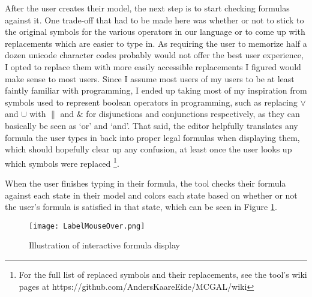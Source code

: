 After the user creates their model, the next step is to start checking formulas against it. One trade-off that had to be made here was whether or not to stick to the original symbols for the various operators in our language or to come up with replacements which are easier to type in. As requiring the user to memorize half a dozen unicode character codes probably would not offer the best user experience, I opted to replace them with more easily accessible replacements I figured would make sense to most users. Since I assume most users of my users to be at least faintly familiar with programming, I ended up taking most of my inspiration from symbols used to represent boolean operators in programming, such as replacing $\vee$ and $\cup$ with $\|$ and $\&$ for disjunctions and conjunctions respectively, as they can basically be seen as `or' and `and'. That said, the editor helpfully translates any formula the user types in back into proper legal formulas when displaying them, which should hopefully clear up any confusion, at least once the user looks up which symbols were replaced \footnote{For the full list of replaced symbols and their replacements, see the tool's wiki pages at https://github.com/AndersKaareEide/MCGAL/wiki}.


When the user finishes typing in their formula, the tool checks their formula against each state in their model and colors each state based on whether or not the user's formula is satisfied in that state, which can be seen in Figure \ref{fig:labelHover}.

\begin{figure}[H]
	\label{fig:labelHover}
	\caption{Illustration of interactive formula display}
	\texttt{[image: LabelMouseOver.png]}
\end{figure}


